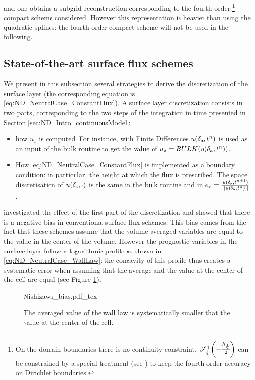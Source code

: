 and one obtains a subgrid reconstruction corresponding to
the fourth-order
\footnote{
On the domain boundaries there is no continuity constraint.
${\cal S}^4_{\frac{1}{2}}\left(-\frac{h_{\frac{1}{2}}}{2}\right)$
can be constrained by a special treatment
(see \cite{piller_finite-volume_2004})
to keep the fourth-order accuracy on Dirichlet boundaries.
}
compact scheme considered.
However this representation is heavier than using the quadratic
splines: the fourth-order compact scheme will not be used in the
following.
\subsection{State-of-the-art surface flux schemes}
\label{sec:ND_NeutralCase_strategies}
We present in this subsection several strategies to derive the
discretization of the surface layer (the corresponding equation
is \eqref{eq:ND_NeutralCase_ConstantFlux}).
A surface layer discretization consists in two parts,
corresponding to the two steps of the integration in time
presented in Section \ref{sec:ND_Intro_continuousModel}:
\begin{itemize}
	\item how $u_\star$ is computed.
		For instance, with Finite Differences
		$u(\delta_{\rm a}, t^n)$ is 
		used as an input of the
		bulk routine to get the value of
		$u_\star = BULK(u(\delta_{\rm a}, t^n))$.
	\item How \eqref{eq:ND_NeutralCase_ConstantFlux}
		is implemented as
		a boundary condition: in particular,
		the height at which the flux is prescribed.
		The space discretisation of
		$u(\delta_{\rm a}, \cdot)$ is the same
		in the bulk routine and in
		$e_\tau= \frac{u(\delta_{\rm a},
		t^{n+1})}
		{||u(\delta_{\rm a}, t^n)||}$.
\end{itemize}
\cite{nishizawa_surface_2018} investigated the effect of the
first part of the discretization and showed that there is a
negative bias in conventional surface flux schemes. This
bias comes from the fact that these schemes assume that the
volume-averaged variables are equal to the value in the center
of the volume. However the prognostic variables in the surface layer
follow a logarithmic profile as shown in
\eqref{eq:ND_NeutralCase_WallLaw}: the concavity of this profile thus
creates a systematic error when assuming that the average and the
value at the center of the cell are equal
(see Figure \ref{fig:ND_NeutralCase_nishizawaBias}).
\begin{figure}
	\centering
	{Nishizawa_bias.pdf_tex}
	\caption{The averaged value of the wall law is
		systematically smaller that the value at
		the center of the cell.}
	\label{fig:ND_NeutralCase_nishizawaBias}
\end{figure}
